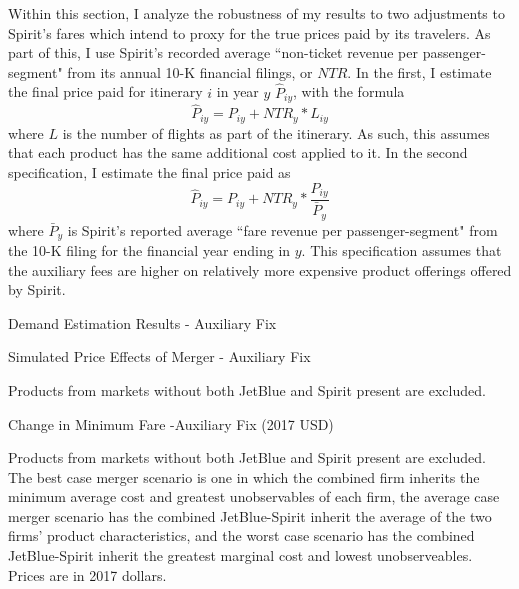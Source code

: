 \documentclass{article}
\begin{document}
\begin{appendices}
    Within this section, I analyze the robustness of my results to two adjustments to Spirit's fares which intend to proxy for the true prices paid by its travelers. As part of this, I use Spirit's recorded average ``non-ticket revenue per passenger-segment" from its annual 10-K financial filings, or $NTR$. In the first, I estimate the final price paid for itinerary $i$ in year $y$ $\hat{P}_{iy}$, with the formula \[\hat{P}_{iy} = P_{iy} + NTR_{y} * L_{iy}\] where $L$ is the number of flights as part of the itinerary. As such, this assumes that each product has the same additional cost applied to it. In the second specification, I estimate the final price paid as \[\hat{P}_{iy} = P_{iy} + NTR_{y} * \frac{P_{iy}}{\bar{P}_{y}}\] where $\bar{P}_{y}$ is Spirit's reported average ``fare revenue per passenger-segment" from the 10-K filing for the financial year ending in $y$. This specification assumes that the auxiliary fees are higher on relatively more expensive product offerings offered by Spirit.

    \begin{table}
        \caption{Demand Estimation Results - Auxiliary Fix}
        \label{tab:Demand_Aux_Scale}
        \begin{center}
        
        \end{center}
    \end{table}

    \begin{table}
        \caption{Simulated Price Effects of Merger - Auxiliary Fix}
        \label{tab:Simulation_Price_Aux_Scale}
                \vspace{-15mm}
        \begin{center}
        
        \end{center}
        \vspace{-5mm}
        \footnotesize{Products from markets without both JetBlue and Spirit present are excluded.}

     \end{table}

    \begin{table}
        \caption{Change in Minimum Fare -Auxiliary Fix (2017 USD)}
        \label{tab:MinimumPrice_Aux_Scale}
                \vspace{-15mm}
        \begin{center}

        \end{center}
        \vspace{-5mm}
        \footnotesize{Products from markets without both JetBlue and Spirit present are excluded. The best case merger scenario is one in which the combined firm inherits the minimum average cost and greatest unobservables of each firm, the average case merger scenario has the combined JetBlue-Spirit inherit the average of the two firms' product characteristics, and the worst case scenario has the combined JetBlue-Spirit inherit the greatest marginal cost and lowest unobserveables. Prices are in 2017 dollars.}
    \end{table}    


\end{appendices}
	
\end{document}

